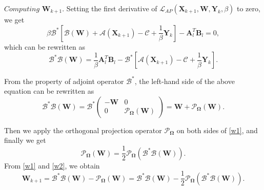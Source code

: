\documentclass[fontset=windows]{article}
\begin{document}
{$\textit{Computing}$  $\mathbf W_{k+1}$. Setting the first derivative of
$\mathcal{L}_{AP}(\mathbf X_{k+1},\mathbf W,\mathbf Y_k,\beta)$ to zero, we get
\begin{equation*}
    \beta \mathcal{B}^*\left[ \mathcal{B}(\mathbf W) + \mathcal{A} (\mathbf X_{k+1} ) - \mathcal{C} +\frac{1}{\beta} \mathbf Y_k \right] - \mathbf A_l^T\mathbf B_l = 0,
\end{equation*}
which can be rewritten as
\begin{equation}
    \mathcal{B}^*\mathcal{B}(\mathbf W) = \frac{1}{\beta}\mathbf A_l^T\mathbf B_l - \mathcal{B}^*\left[ \mathcal{A} (\mathbf X_{k+1} ) - \mathcal{C} +\frac{1}{\beta} \mathbf Y_k \right].
\end{equation}

From the property of adjoint operator $\mathcal{B}^*$, the left-hand side of the above equation can be rewritten as
\begin{equation}
    \mathcal{B}^*\mathcal{B}(\mathbf W) = \mathcal{B}^* \begin{pmatrix}
        -\mathbf W & 0 \\
        0 & \mathcal{P}_{\mathbf\Omega}(\mathbf W)
    \end{pmatrix} = \mathbf W + \mathcal{P}_{\mathbf\Omega}(\mathbf W).
    \label{w1}
\end{equation}

Then we apply the orthogonal projection operator $\mathcal{P}_{\mathbf\Omega}$ on both sides of \eqref{w1}, and finally we get
\begin{equation}
    \mathcal{P}_{\mathbf\Omega}(\mathbf W) = \frac{1}{2} \mathcal{P}_{\mathbf\Omega}(\mathcal{B}^*\mathcal{B}(\mathbf W)).\label{w2}
\end{equation}
From \eqref{w1} and \eqref{w2}, we obtain
\begin{equation*}
    \mathbf W_{k+1} = \mathcal{B}^*\mathcal{B}(\mathbf W) - \mathcal{P}_{\mathbf\Omega}(\mathbf W) = \mathcal{B}^*\mathcal{B}(\mathbf W) -\frac{1}{2} \mathcal{P}_{\mathbf\Omega}(\mathcal{B}^*\mathcal{B}(\mathbf W)). 
\end{equation*}

}
\end{document}
